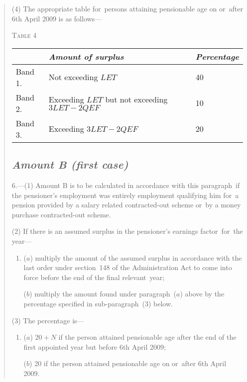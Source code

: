 \documentclass[12pt,a4paper]{article}
\begin{document}
\begin{quotation}
(4) The appropriate table for~persons attaining pensionable age on or~after 6th April 2009 is as follows—

\medskip

\noindent\textsc{Table 4}

{\noindent\footnotesize
\begin{longtable}{lll}
\hline
&\itshape Amount of surplus	&\itshape Percentage\\
\hline
\endhead
\hline
\endlastfoot
Band 1. 	&Not exceeding $LET$	&40\\
Band 2. 	&Exceeding $LET$ but not exceeding $3LET - 2QEF$	&10\\
Band 3. 	&Exceeding $3LET - 2QEF$	&20\\
\end{longtable}

}

\subsection*{\itshape Amount B (first case)}

6.---(1) Amount B is to be calculated in accordance with this paragraph~if the pensioner’s employment was entirely employment qualifying him for~a pension provided by a salary related contracted-out scheme or~by a money purchase contracted-out scheme.

(2) If there is an assumed surplus in the pensioner’s earnings factor~for~the year—
\begin{enumerate}\item[]
($a$) multiply the amount of the assumed surplus in accordance with the last order under section~148 of the Administration Act to come into force before the end of the final relevant~year;

($b$) multiply the amount found under paragraph~($a$)  above by the percentage specified in sub-paragraph~(3)  below.
\end{enumerate}

(3) The percentage is—
\begin{enumerate}\item[]
($a$) $20 + N$ if the person attained pensionable age after the end of the first appointed year but before 6th April 2009;

($b$) 20 if the person attained pensionable age on or~after 6th April 2009. 
\end{enumerate}


\end{quotation}
\end{document}
